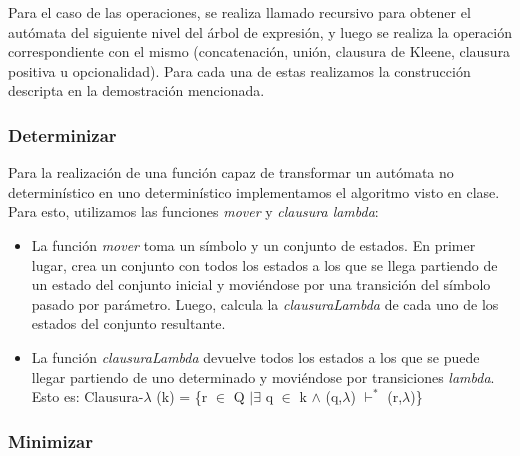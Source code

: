\documentclass[a4paper, 10pt, twoside]{article}
\begin{document}
Para el caso de las operaciones, se realiza llamado recursivo para obtener el autómata del siguiente nivel del árbol de expresión, y luego se realiza la operación correspondiente con el mismo (concatenación, unión, clausura de Kleene, clausura positiva u opcionalidad). Para cada una de estas realizamos la construcción descripta en la demostración mencionada.

\subsubsection{Determinizar}

Para la realización de una función capaz de transformar un autómata no determinístico en uno determinístico implementamos el algoritmo visto en clase. Para esto, utilizamos las funciones \textit{mover} y \textit{clausura lambda}:
\begin{itemize}
\item La función \textit{mover} toma un símbolo y un conjunto de estados. En primer lugar, crea un conjunto con todos los estados a los que se llega partiendo de un estado del conjunto inicial y moviéndose por una transición del símbolo pasado por parámetro. Luego, calcula la \textit{clausuraLambda} de cada uno de los estados del conjunto resultante.
\item La función \textit{clausuraLambda} devuelve todos los estados a los que se puede llegar partiendo de uno determinado y moviéndose por transiciones \textit{lambda}. Esto es:
Clausura-$\lambda$ (k) = \{r $\in$ Q $| \exists$ q $\in$ k $\land$ (q,$\lambda$) $\vdash^{*}$ (r,$\lambda$)\}
\end{itemize}

\subsubsection{Minimizar}
\end{document}
